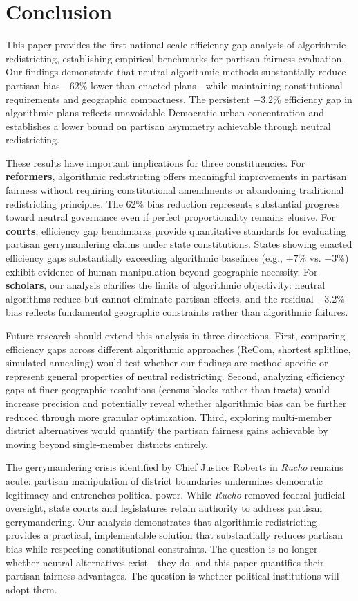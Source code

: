 \section{Conclusion}

This paper provides the first national-scale efficiency gap analysis of algorithmic redistricting, establishing empirical benchmarks for partisan fairness evaluation. Our findings demonstrate that neutral algorithmic methods substantially reduce partisan bias—62\% lower than enacted plans—while maintaining constitutional requirements and geographic compactness. The persistent $-3.2\%$ efficiency gap in algorithmic plans reflects unavoidable Democratic urban concentration and establishes a lower bound on partisan asymmetry achievable through neutral redistricting.

These results have important implications for three constituencies. For \textbf{reformers}, algorithmic redistricting offers meaningful improvements in partisan fairness without requiring constitutional amendments or abandoning traditional redistricting principles. The 62\% bias reduction represents substantial progress toward neutral governance even if perfect proportionality remains elusive. For \textbf{courts}, efficiency gap benchmarks provide quantitative standards for evaluating partisan gerrymandering claims under state constitutions. States showing enacted efficiency gaps substantially exceeding algorithmic baselines (e.g., $+7\%$ vs. $-3\%$) exhibit evidence of human manipulation beyond geographic necessity. For \textbf{scholars}, our analysis clarifies the limits of algorithmic objectivity: neutral algorithms reduce but cannot eliminate partisan effects, and the residual $-3.2\%$ bias reflects fundamental geographic constraints rather than algorithmic failures.

Future research should extend this analysis in three directions. First, comparing efficiency gaps across different algorithmic approaches (ReCom, shortest splitline, simulated annealing) would test whether our findings are method-specific or represent general properties of neutral redistricting. Second, analyzing efficiency gaps at finer geographic resolutions (census blocks rather than tracts) would increase precision and potentially reveal whether algorithmic bias can be further reduced through more granular optimization. Third, exploring multi-member district alternatives would quantify the partisan fairness gains achievable by moving beyond single-member districts entirely.

The gerrymandering crisis identified by Chief Justice Roberts in \emph{Rucho} remains acute: partisan manipulation of district boundaries undermines democratic legitimacy and entrenches political power. While \emph{Rucho} removed federal judicial oversight, state courts and legislatures retain authority to address partisan gerrymandering. Our analysis demonstrates that algorithmic redistricting provides a practical, implementable solution that substantially reduces partisan bias while respecting constitutional constraints. The question is no longer whether neutral alternatives exist—they do, and this paper quantifies their partisan fairness advantages. The question is whether political institutions will adopt them.
